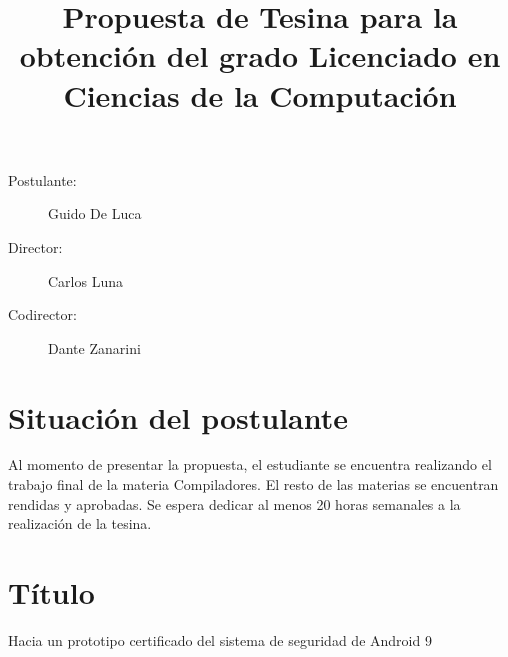 \documentclass[a4paper]{article}
\begin{document}
\title{Propuesta de Tesina para la obtención del grado Licenciado en Ciencias de la Computación}
\maketitle

\begin{description}
    \item[Postulante: ] Guido De Luca
    \item[Director: ] Carlos Luna
    \item[Codirector: ] Dante Zanarini
\end{description}

\section{Situación del postulante}
Al momento de presentar la propuesta, el estudiante se encuentra realizando el
trabajo final de la materia Compiladores. El resto de las materias se encuentran
rendidas y aprobadas. Se espera dedicar al menos 20 horas semanales a la realización
de la tesina.

\section{Título}
Hacia un prototipo certificado del sistema de seguridad de Android 9









\printbibliography
\end{document}
